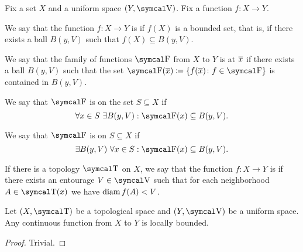 \begin{definition}\label{def:bounded_function}
  Fix a set \( X \) and a uniform space \( (Y, \V) \). Fix a function \( f: X \to Y \).

  \begin{defenum}
     We say that the function \( f: X \to Y \) is  if \( f(X) \) is a bounded set, that is, if there exists a ball \( B(y, V) \) such that \( f(X) \subseteq B(y, V) \).

     We say that the family of functions \( \F \) from \( X \) to \( Y \) is  at \( \overline{x} \) if there exists a ball \( B(y, V) \) such that the set \( \F(\Ol x) \coloneqq \{ f(\Ol x) \colon f \in \F \} \) is contained in \( B(y, V) \).

     We say that \( \F \) is  on the set \( S \subseteq X \) if
    \begin{equation*}
      \forall x \in S \ \exists B(y, V) : \F(x) \subseteq B(y, V).
    \end{equation*}

     We say that \( \F \) is  on \( S \subseteq X \) if
    \begin{equation*}
      \exists B(y, V) \ \forall x \in S : \F(x) \subseteq B(y, V).
    \end{equation*}

     If there is a topology \( \T \) on \( X \), we say that the function \( f: X \to Y \) is  if there exists an entourage \( V \in \V \) such that for each neighborhood \( A \in \T(x) \) we have \( \operatorname{diam}{f(A)} < V \).
  \end{defenum}
\end{definition}

\begin{proposition}\label{thm:continuous_implies_locally_bounded}
  Let \( (X, \T) \) be a topological space and \( (Y, \V) \) be a uniform space. Any continuous function from \( X \) to \( Y \) is locally bounded.
\end{proposition}
\begin{proof}
  Trivial.
\end{proof}

